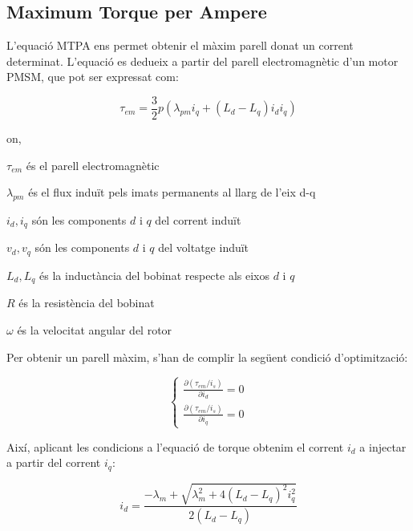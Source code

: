 \subsection{ Maximum Torque per Ampere }
{
    L'equació \ac{MTPA} ens permet obtenir el màxim parell donat un corrent
    determinat. L'equació es dedueix a partir del parell electromagnètic d'un
    motor PMSM, que pot ser expressat com:
    
    \begin{equation}
        \tau_{em} = \frac{3}{2}p(\lambda_{pm} i_q + (L_d - L_q) i_d i_q)
    \end{equation}

    on,
    \begin{description}
    {
        \item $\tau_{em}$ és el parell electromagnètic
        \item $\lambda_{pm}$ és el flux induït pels imats permanents al llarg
        de l'eix d-q
        \item $i_d, i_q$ són les components $d$ i $q$ del corrent induït
        \item $v_d, v_q$ són les components $d$ i $q$ del voltatge induït
        \item $L_d, L_q$ és la inductància del bobinat respecte als eixos $d$ i
        $q$
        \item $R$ és la resistència del bobinat
        \item $\omega$ és la velocitat angular del rotor
    }
    \end{description}

    Per obtenir un parell màxim, s'han de complir la següent condició
    d'optimització:
    
    \begin{equation}
        \left\{
            \begin{aligned}
                \frac{\partial (\tau_{em} / i_s)}{\partial i_d} = 0 \\
                \frac{\partial (\tau_{em} / i_s)}{\partial i_q} = 0
            \end{aligned}
        \right.
    \end{equation}

    Així, aplicant les condicions a l'equació de torque obtenim el corrent
    $i_d$ a injectar a partir del corrent $i_q$:

    \begin{equation}
        i_d = \frac{-\lambda_m + \sqrt{\lambda_m^2 + 4 (L_d - L_q)^2 i_q^2}}{ 2 (L_d - L_q) }
    \end{equation}

}
